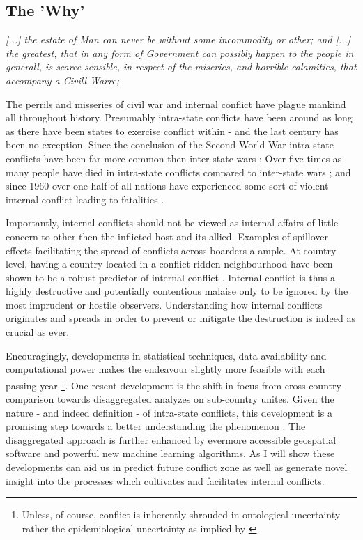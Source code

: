 \documentclass[a4paper]{article}
\begin{document}
\subsection{The 'Why'}

\begin{displayquote}
\emph{[...] the estate of Man can never be without some incommodity or other; and [...] the greatest, that in any form of Government can possibly happen to the people in generall, is scarce sensible, in respect of the miseries, and horrible calamities, that accompany a Civill Warre;} \cite[128]{Hobbes_1991}  \par

\end{displayquote}

The perrils and misseries of civil war and internal conflict have plague mankind all throughout history. Presumably intra-state conflicts have been around as long as there have been states to exercise conflict within - and the last century has been no exception. Since the conclusion of the Second World War intra-state conflicts have been far more common then inter-state wars \citep[563]{Collier_Hoeffler_2004}; Over five times as many people have died in intra-state conflicts compared to inter-state wars \citep[563]{Collier_Hoeffler_2004}; and since 1960 over one half of all nations have experienced some sort of violent internal conflict leading to fatalities \citep[3-4]{Blattman_Miguel_2010}.\par

Importantly, internal conflicts should not be viewed as internal affairs of little concern to other then the inflicted host and its allied. Examples of spillover effects facilitating the spread of conflicts across boarders a ample. At country level, having a country located in a conflict ridden neighbourhood have been shown to be a robust predictor of internal conflict \citep{Hegre_Sambanis_2006,Goldstone_2010}. Internal conflict is thus a highly destructive and potentially contentious malaise only to be ignored by the most imprudent or hostile observers. Understanding how internal conflicts originates and spreads in order to prevent or mitigate the destruction is indeed as crucial as ever.\par

Encouragingly, developments in statistical techniques, data availability and computational power makes the endeavour slightly more feasible with each passing year \footnote{Unless, of course, conflict is inherently shrouded in ontological uncertainty rather the epidemiological uncertainty as implied by \cite{Gartzke_1999}}. One resent development is the shift in focus from cross country comparison towards disaggregated analyzes on sub-country unites. Given the nature - and indeed definition - of intra-state conflicts, this development is a promising step towards a better understanding the phenomenon \citep{Cederman_Gleditsch_2009}. The disaggregated approach is further enhanced by evermore accessible geospatial software and powerful new machine learning algorithms. As I will show these developments can aid us in predict future conflict zone as well as generate novel insight into the processes which cultivates and facilitates internal conflicts.\par
\end{document}
